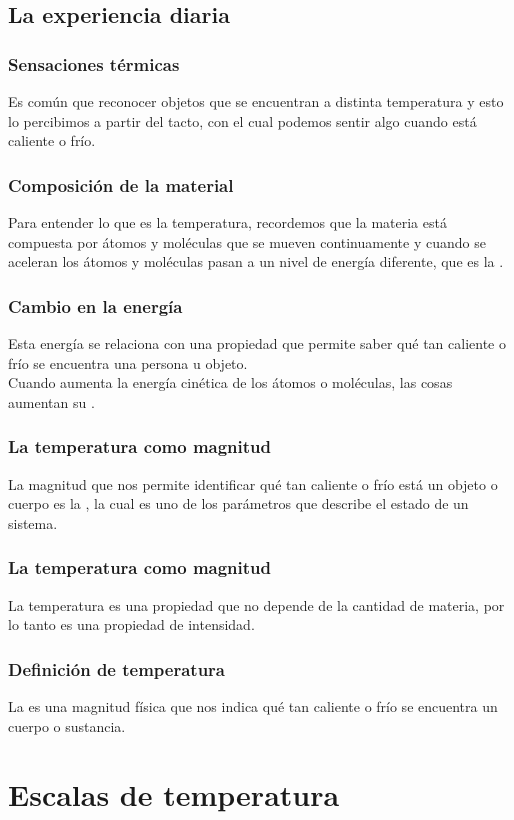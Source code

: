 \documentclass[14pt]{beamer}
\begin{document}
\subsection{La experiencia diaria}

\begin{frame}
\frametitle{Sensaciones térmicas}
Es común que reconocer objetos que se encuentran a distinta temperatura y esto lo percibimos a partir del tacto, con el cual podemos sentir algo cuando está caliente o frío.
\end{frame}
\begin{frame}
\frametitle{Composición de la material}
Para entender lo que es la temperatura, recordemos que la materia está compuesta por átomos y moléculas que se mueven continuamente \pause y cuando se aceleran los átomos y moléculas pasan a un nivel de energía diferente, que es la .
\end{frame}
\begin{frame}
\frametitle{Cambio en la energía}
Esta energía se relaciona con una propiedad que permite saber qué tan caliente o frío se encuentra una persona u objeto.
\\
\bigskip
\pause
Cuando aumenta la energía cinética de los átomos o moléculas, las cosas aumentan su .
\end{frame}
\begin{frame}
\frametitle{La temperatura como magnitud}
La magnitud que nos permite identificar qué tan caliente o frío está un objeto o cuerpo es la , \pause la cual es uno de los parámetros que describe el estado de un sistema.
\end{frame}
\begin{frame}
\frametitle{La temperatura como magnitud}
La temperatura es una propiedad que no depende de la cantidad de materia, por lo tanto es una propiedad de intensidad.
\end{frame}
\begin{frame}
\frametitle{Definición de temperatura}
La  es una magnitud física que nos indica qué tan caliente o frío se encuentra un cuerpo o sustancia.
\end{frame}

\section{Escalas de temperatura}
\end{document}
